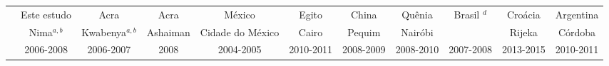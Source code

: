 
\begin{tabular}{ccccccccccccc}
\hline
& \multicolumn{2}{c}{Este estudo} & \multicolumn{2}{c}{Acra} & Acra & México & Egito & China & Quênia & Brasil $^d$ & Croácia & Argentina \\

& \multicolumn{2}{c}{Nima$^{a,b}$} & \multicolumn{2}{c}{Kwabenya$^{a,b}$} & Ashaiman & Cidade do México & Cairo  & Pequim & Nairóbi &   & Rijeka & Córdoba\\

& \multicolumn{2}{c}{2006-2008} & \multicolumn{2}{c}{2006-2007} & 2008 & 2004-2005 & 2010-2011 & 2008-2009 &  2008-2010 & 2007-2008 & 2013-2015 & 2010-2011\\


\end{tabular}
